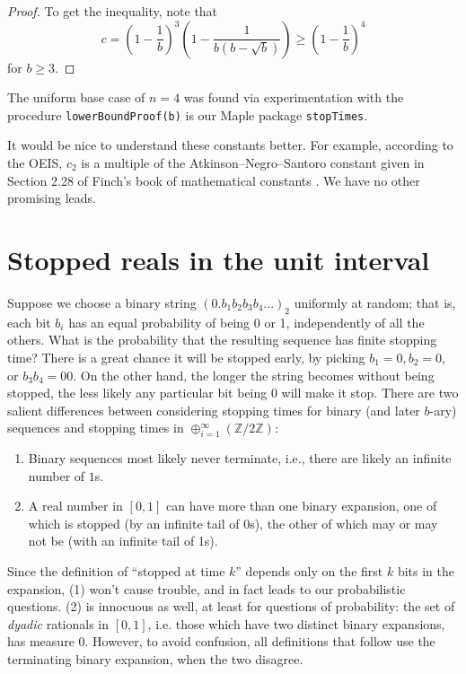 \documentclass[12pt]{article}
\newcommand{\Z}{\mathbb{Z}}
\theoremstyle{definition}
\begin{document}
\begin{proof}
    To get the inequality, note that
    \begin{equation*}
        c = \left( 1 - \frac{1}{b} \right)^3 \left(1 - \frac{1}{b(b - \sqrt{b})}\right)
        \geq
        \left( 1 - \frac{1}{b} \right)^4
    \end{equation*}
    for $b \geq 3$.
\end{proof}

The uniform base case of $n = 4$ was found via experimentation with
the procedure \texttt{lowerBoundProof(b)} is our Maple package
\texttt{stopTimes}.

It would be nice to understand these constants better. For example, according
to the OEIS, $c_2$ is a multiple of the Atkinson--Negro--Santoro constant given
in Section 2.28 of Finch's book of mathematical constants
\cite{finch2003mathematical}. We have no other promising leads.

\section{Stopped reals in the unit interval}
\label{sec:reals}

Suppose we choose a binary string $(0.b_1 b_2 b_3 b_4 ...)_2$ uniformly at
random; that is, each bit $b_i$ has an equal probability of being 0 or 1,
independently of all the others.  What is the probability that the resulting
sequence has finite stopping time? There is a great chance it will be stopped
early, by picking $b_1=0, b_2=0,$ or $b_3 b_4 = 00.$ On the other hand, the
longer the string becomes without being stopped, the less likely any particular
bit being $0$ will make it stop. There are two salient differences between
considering stopping times for binary (and later $b$-ary) sequences and
stopping times in $\oplus_{i=1}^\infty (\Z/2\Z)$:
\begin{enumerate}
    \item Binary sequences most likely never terminate, i.e., there are likely
        an infinite number of $1$s.
    \item A real number in $[0,1]$ can have more than one binary expansion,
        one of which is stopped (by an infinite tail of 0s), the other of which
        may or may not be (with an infinite tail of 1s).
\end{enumerate}
Since the definition of ``stopped at time $k$'' depends only on the first $k$ bits in the expansion,
(1) won't cause trouble, and in fact leads to our probabilistic questions.
(2) is innocuous as well, at least for questions of probability: the set of \emph{dyadic} rationals
in $[0,1]$, i.e. those which have two distinct binary expansions, has measure 0.
However, to avoid confusion, all definitions that follow use the terminating binary expansion, when the two disagree.
\end{document}
